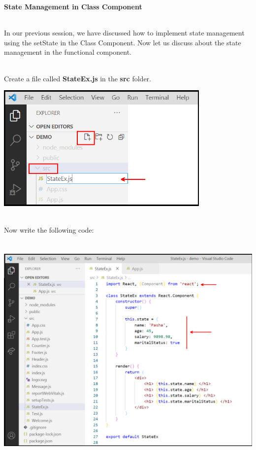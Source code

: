 \documentclass{article}
\begin{document}
\noindent \textbf{State Management in Class Component}

\noindent 

\noindent \\
In our previous session, we have discussed how to implement state management using the setState in the Class Component. Now let us discuss about the state management in the functional component.

\noindent 

\noindent \\
Create a file called \textbf{StateEx.js} in the \textbf{src} folder.

\begin{center}
	\noindent \includegraphics*[width=4.12in, height=2.45in]{IMG-09-01}
\end{center}

\noindent 

\noindent \\
Now write the following code:

\begin{center}
	\noindent \includegraphics*[width=5.92in, height=4.58in]{IMG-09-02}
\end{center}
\end{document}
